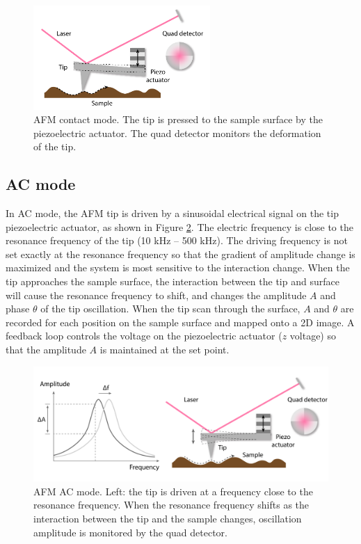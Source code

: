 \documentclass[pdflatex, sectionletters, 12pt, final, phd]{pittetd}    %
\begin{document}
\begin{figure}[h!]
	\centering
	\includegraphics[width=0.6\textwidth]{Drawing/ContactAFM.pdf}
	\caption[AFM contact mode]{AFM contact mode. The tip is pressed to the sample surface by the piezoelectric actuator. The quad detector monitors the deformation of the tip.}
	\label{FIG:ContactAFM}
\end{figure}


\subsection{AC mode}

In AC mode, the AFM tip is driven by a sinusoidal electrical signal on the tip piezoelectric actuator, as shown in Figure \ref{FIG:ACAFM}. The electric frequency is close to the resonance frequency of the tip (10 kHz -- 500 kHz). The driving frequency is not set exactly at the resonance frequency so that the gradient of amplitude change is maximized and the system is most sensitive to the interaction change. When the tip approaches the sample surface, the interaction between the tip and surface will cause the resonance frequency to shift, and changes the amplitude $A$ and phase $\theta$ of the tip oscillation. When the tip scan through the surface, $A$ and $\theta$ are recorded for each position on the sample surface and mapped onto a 2D image. A feedback loop controls the voltage on the piezoelectric actuator ($z$ voltage) so that the amplitude $A$ is maintained at the set point.

\begin{figure}[h!]
	\centering
	\includegraphics[width=1.0\textwidth]{Drawing/ACAFM.pdf}
	\caption[AFM AC mode]{AFM AC mode. Left: the tip is driven at a frequency close to the resonance frequency. When the resonance frequency shifts as the interaction between the tip and the sample changes, oscillation amplitude is monitored by the quad detector.}
	\label{FIG:ACAFM}
\end{figure}
\end{document}
